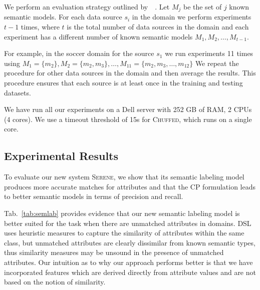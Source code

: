\documentclass[letterpaper]{article} %
\newcommand{\authornote}[3]{
  {\fbox{\sc 
  #1}:$\blacktriangleright$\textcolor{#2}{\small{#3}}$\blacktriangleleft$}%
}
\newcommand{\npr}[1]{\authornote{NPR}{orange}{#1}}
\newcommand{\chuffed}{\textsc{Chuffed}}
\newcommand{\serene}{\textsc{Serene}}
\newcommand{\ignore}[1]{}
\newcommand{\forijcai}[1]{}
\newcommand{\citeasnoun}[1]{\citeauthor{#1}~\shortcite{#1}}
\begin{document}
We perform an evaluation strategy outlined by~\citeasnoun{taheriyan2016learning}.
Let $M_j$ be the set of $j$ known semantic models.
For each data source $s_i$ in the domain we perform experiments $t-1$ times,
where $t$ is the total number of data sources in the domain and each experiment has a different number of known semantic models $M_1, M_2, \ldots, M_{t-1}$.
\forijcai{The case with $M_{t-1}$ known semantic models corresponds to leave-one-out validation strategy.} 
For example, in the soccer domain for the source $s_1$ we run experiments 11 times using $M_1=\{m_2\}, M_2=\{m_2, m_3\}, \ldots, M_{11}=\{m_2, m_3, \ldots, m_{12}\}$
We repeat the procedure for other data sources in the domain and then average the results.
This procedure ensures that each source is at least once in the training and testing datasets.


We have run all our experiments on a Dell server with 252 GB of RAM, 2 CPUs (4 cores).
We use a timeout threshold of 15s for \chuffed{}, which 
runs on a single core.

\subsection{Experimental Results}

To evaluate our new system \serene{}, we show that its semantic labeling model 
produces more accurate matches for attributes and that the CP formulation leads 
to better semantic models in terms of precision and recall.

\ignore{We have developed a new approach for semantic labeling which can 
efficiently handle the \emph{unknown} class.}
\ignore{We demonstrate its efficiency by comparing against the state-of-the-art 
approach DSL~\cite{Pham:semantic}. } %
Tab.~\ref{tab:semlab} provides evidence that our new semantic labeling model is better suited for the task when there are unmatched attributes in domains.
DSL uses heuristic measures to capture the similarity of attributes within the same class, but 
unmatched attributes are clearly dissimilar from known semantic types, thus similarity measures may be unsound in the presence of unmatched attributes.
Our intuition as to why our approach performs better is that we have 
incorporated features which are derived directly from attribute values and are 
not based on the notion of similarity.
\end{document}
